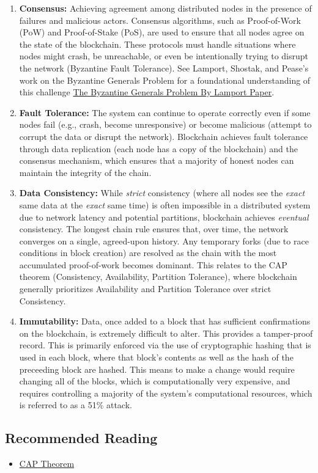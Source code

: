 \begin{enumerate}[itemsep=1pt, topsep=2pt]
    \item \textbf{Consensus:} Achieving agreement among distributed nodes in the presence of failures and malicious actors. Consensus algorithms, such as Proof-of-Work (PoW) and Proof-of-Stake (PoS), are used to ensure that all nodes agree on the state of the blockchain. These protocols must handle situations where nodes might crash, be unreachable, or even be intentionally trying to disrupt the network (Byzantine Fault Tolerance).  See Lamport, Shostak, and Pease's work on the Byzantine Generals Problem for a foundational understanding of this challenge \href{https://lamport.azurewebsites.net/pubs/byz.pdf}{The Byzantine Generals Problem By Lamport Paper}.

    \item \textbf{Fault Tolerance:} The system can continue to operate correctly even if some nodes fail (e.g., crash, become unresponsive) or become malicious (attempt to corrupt the data or disrupt the network). Blockchain achieves fault tolerance through data replication (each node has a copy of the blockchain) and the consensus mechanism, which ensures that a majority of honest nodes can maintain the integrity of the chain.

    \item \textbf{Data Consistency:} While \textit{strict} consistency (where all nodes see the \textit{exact} same data at the \textit{exact} same time) is often impossible in a distributed system due to network latency and potential partitions, blockchain achieves \textit{eventual} consistency. The longest chain rule ensures that, over time, the network converges on a single, agreed-upon history. Any temporary forks (due to race conditions in block creation) are resolved as the chain with the most accumulated proof-of-work becomes dominant. This relates to the CAP theorem (Consistency, Availability, Partition Tolerance), where blockchain generally prioritizes Availability and Partition Tolerance over strict Consistency.

    \item \textbf{Immutability:} Data, once added to a block that has sufficient confirmations on the blockchain, is extremely difficult to alter. This provides a tamper-proof record. This is primarily enforced via the use of cryptographic hashing that is used in each block, where that block's contents as well as the hash of the preceeding block are hashed. This means to make a change would require changing all of the blocks, which is computationally very expensive, and requires controlling a majority of the system's computational resources, which is referred to as a 51\% attack.
\end{enumerate}

\subsection{Recommended Reading}
\begin{itemize}[noitemsep]
	\item \href{https://book.mixu.net/distsys/abstractions.html}{CAP Theorem}
\end{itemize}
